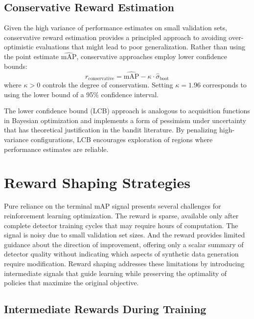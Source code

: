 \subsection{Conservative Reward Estimation}

Given the high variance of performance estimates on small validation sets, conservative reward estimation provides a principled approach to avoiding over-optimistic evaluations that might lead to poor generalization. Rather than using the point estimate $\widehat{\text{mAP}}$, conservative approaches employ lower confidence bounds:
\begin{equation}
r_{\text{conservative}} = \widehat{\text{mAP}} - \kappa \cdot \hat{\sigma}_{\text{boot}}
\label{eq:conservative_reward}
\end{equation}
where $\kappa > 0$ controls the degree of conservatism. Setting $\kappa = 1.96$ corresponds to using the lower bound of a 95\% confidence interval.

The lower confidence bound (LCB) approach is analogous to acquisition functions in Bayesian optimization and implements a form of pessimism under uncertainty that has theoretical justification in the bandit literature. By penalizing high-variance configurations, LCB encourages exploration of regions where performance estimates are reliable.

\section{Reward Shaping Strategies}
\label{sec:reward_shaping}

Pure reliance on the terminal mAP signal presents several challenges for reinforcement learning optimization. The reward is sparse, available only after complete detector training cycles that may require hours of computation. The signal is noisy due to small validation set sizes. And the reward provides limited guidance about the direction of improvement, offering only a scalar summary of detector quality without indicating which aspects of synthetic data generation require modification. Reward shaping addresses these limitations by introducing intermediate signals that guide learning while preserving the optimality of policies that maximize the original objective.

\subsection{Intermediate Rewards During Training}

